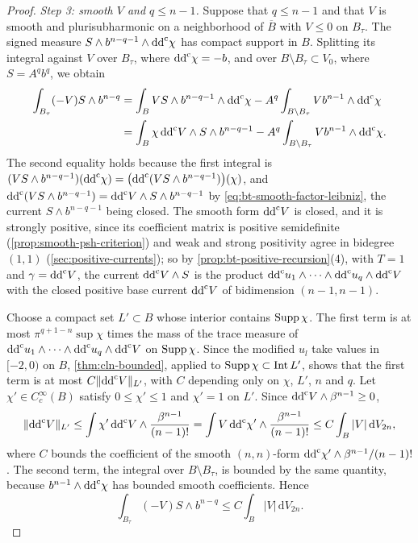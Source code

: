 \begin{proof}
\emph{Step 3: smooth $V$ and $q\le n-1$.} Suppose that $q\le n-1$ and that $V$ is smooth and plurisubharmonic on a neighborhood of $\overline B$ with $V\le0$ on $B_\tau$. The signed measure $S\wedge b^{n-q-1}\wedge\mathrm{dd}^{\mathrm{c}}\chi$ has compact support in $B$. Splitting its integral against $V$ over $B_\tau$, where $\mathrm{dd}^{\mathrm{c}}\chi=-b$, and over $B\setminus B_\tau\subset V_0$, where $S=A^qb^q$, we obtain
\[
 \begin{aligned}
 \int_{B_\tau}(-V)S\wedge b^{n-q}
 &=\int_B V S\wedge b^{n-q-1}\wedge\mathrm{dd}^{\mathrm{c}}\chi
       -A^q\int_{B\setminus B_\tau}V b^{n-1}\wedge\mathrm{dd}^{\mathrm{c}}\chi\\
 &=\int_B\chi\,\mathrm{dd}^{\mathrm{c}} V\wedge S\wedge b^{n-q-1}
       -A^q\int_{B\setminus B_\tau}V b^{n-1}\wedge\mathrm{dd}^{\mathrm{c}}\chi.
 \end{aligned}
\]
The second equality holds because the first integral is $(VS\wedge b^{n-q-1})(\mathrm{dd}^{\mathrm{c}}\chi)=\bigl(\mathrm{dd}^{\mathrm{c}}(VS\wedge b^{n-q-1})\bigr)(\chi)$, and $\mathrm{dd}^{\mathrm{c}}(VS\wedge b^{n-q-1})=\mathrm{dd}^{\mathrm{c}} V\wedge S\wedge b^{n-q-1}$ by \eqref{eq:bt-smooth-factor-leibniz}, the current $S\wedge b^{n-q-1}$ being closed. The smooth form $\mathrm{dd}^{\mathrm{c}} V$ is closed, and it is strongly positive, since its coefficient matrix is positive semidefinite (\cref{prop:smooth-psh-criterion}) and weak and strong positivity agree in bidegree $(1,1)$ (\cref{sec:positive-currents}); so by \cref{prop:bt-positive-recursion}(4), with $T=1$ and $\gamma=\mathrm{dd}^{\mathrm{c}} V$, the current $\mathrm{dd}^{\mathrm{c}} V\wedge S$ is the product $\mathrm{dd}^{\mathrm{c}} u_1\wedge\cdots\wedge\mathrm{dd}^{\mathrm{c}} u_q\wedge\mathrm{dd}^{\mathrm{c}} V$ with the closed positive base current $\mathrm{dd}^{\mathrm{c}} V$ of bidimension $(n-1,n-1)$.

Choose a compact set $L'\subset B$ whose interior contains $\operatorname{Supp}\chi$. The first term is at most $\pi^{q+1-n}\sup\chi$ times the mass of the trace measure of $\mathrm{dd}^{\mathrm{c}} u_1\wedge\cdots\wedge\mathrm{dd}^{\mathrm{c}} u_q\wedge\mathrm{dd}^{\mathrm{c}} V$ on $\operatorname{Supp}\chi$. Since the modified $u_l$ take values in $[-2,0)$ on $B$, \cref{thm:cln-bounded}, applied to $\operatorname{Supp}\chi\subset\operatorname{Int} L'$, shows that the first term is at most $C\|\mathrm{dd}^{\mathrm{c}} V\|_{L'}$, with $C$ depending only on $\chi$, $L'$, $n$ and $q$. Let $\chi'\in C^\infty_c(B)$ satisfy $0\le\chi'\le1$ and $\chi'=1$ on $L'$. Since $\mathrm{dd}^{\mathrm{c}} V\wedge\beta^{n-1}\ge0$,
\[
 \|\mathrm{dd}^{\mathrm{c}} V\|_{L'}\le\int\chi'\,\mathrm{dd}^{\mathrm{c}} V\wedge\frac{\beta^{n-1}}{(n-1)!}=\int V\,\mathrm{dd}^{\mathrm{c}}\chi'\wedge\frac{\beta^{n-1}}{(n-1)!}\le C\int_B|V|\,\mathrm{d}V_{2n},
\]
where $C$ bounds the coefficient of the smooth $(n,n)$-form $\mathrm{dd}^{\mathrm{c}}\chi'\wedge\beta^{n-1}/(n-1)!$. The second term, the integral over $B\setminus B_\tau$, is bounded by the same quantity, because $b^{n-1}\wedge\mathrm{dd}^{\mathrm{c}}\chi$ has bounded smooth coefficients. Hence
\[
 \int_{B_\tau}(-V)S\wedge b^{n-q}\le C\int_B|V|\,\mathrm{d}V_{2n}.
\]


\end{proof}
